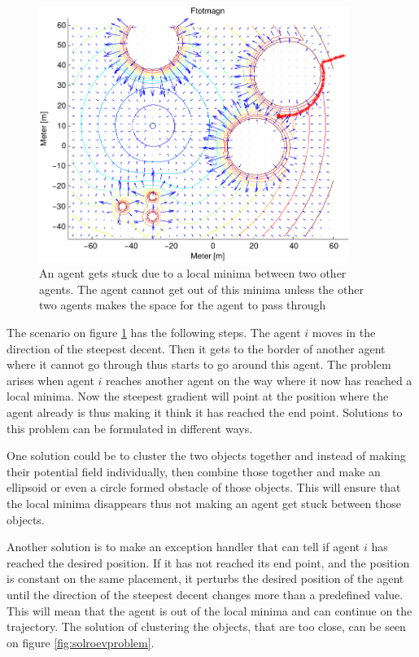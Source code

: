 \begin{figure}[htbp]
  \includegraphics[width=0.9\textwidth]{fig/ftotmagnfigpdf3}
	\caption{An agent gets stuck due to a local minima between two other
	agents. The agent cannot get out of this minima unless the other two
	agents makes the space for the agent to pass through}
  \label{fig:roevproblem}
\end{figure}

The scenario on figure \ref{fig:roevproblem} has the following steps.
The agent $i$ moves in the direction of the steepest decent. Then it
gets to the border of another agent where it cannot go through thus
starts to go around this agent. The problem arises when agent $i$
reaches another agent on the way where it now has reached a local
minima. Now the steepest gradient will point at the position where the
agent already is thus making it think it has reached the end point.
Solutions to this problem can be formulated in different ways.

One solution could be to cluster the two objects together and instead
of making their potential field individually, then combine those
together and make an ellipsoid or even a circle formed obstacle of
those objects. This will ensure that the local minima disappears thus
not making an agent get stuck between those objects.

Another solution is to make an exception handler that can tell if
agent $i$ has reached the desired position. If it has not reached its
end point, and the position is constant on the same placement, it
perturbs the desired position of the agent until the direction of the
steepest decent changes more than a predefined value. This will mean
that the agent is out of the local minima and can continue on the
trajectory.  The solution of clustering the objects, that are too
close, can be seen on figure \ref{fig:solroevproblem}.

